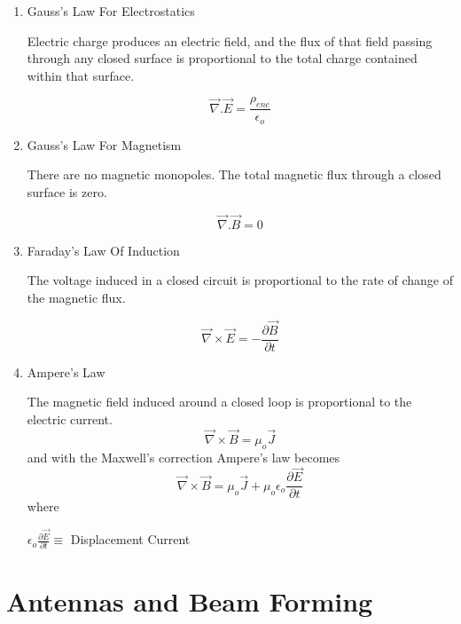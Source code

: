 \begin{enumerate}
   \item Gauss’s Law For Electrostatics

      Electric charge produces an electric field, and the flux of that field passing through any closed surface is proportional to the total charge contained within that surface.

      \begin{equation}
      \vec{\nabla}.\vec{E} = \frac{\rho_{enc}}{\epsilon_{o}}
      \end{equation}

   \item Gauss’s Law For Magnetism

   There are no magnetic monopoles. The total magnetic flux through a closed surface is zero.

   \begin{equation}
   \vec{\nabla}.\vec{B} = 0
   \end{equation}

   \item Faraday’s Law Of Induction

   The voltage induced in a closed circuit is proportional to the rate of change of the magnetic flux.

   \begin{equation}
   \vec{\nabla}\times\vec{E} = - \frac{\partial\vec{B}}{\partial t}
   \end{equation}

   \item Ampere’s Law

      The magnetic field induced around a closed loop is proportional to the electric current.
      \begin{equation}
      \vec{\nabla}\times\vec{B} =\mu_{o}\vec{J}
      \end{equation}
      and with the Maxwell's correction Ampere's law becomes
      \begin{equation}
      \vec{\nabla}\times\vec{B} =\mu_{o}\vec{J}+\mu_{o}\epsilon_{o}\frac{\partial\vec{E}}{\partial t}
      \end{equation}
      where

      $\epsilon_{o}\frac{\partial\vec{E}}{\partial t}\equiv$ Displacement Current

\end{enumerate}

\section{Antennas and Beam Forming}

